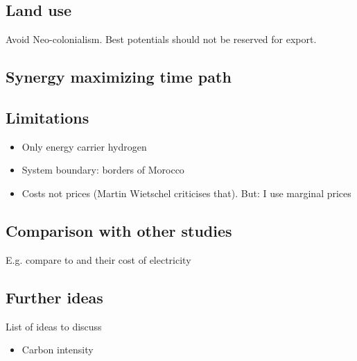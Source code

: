 
\subsection{Land use}
Avoid Neo-colonialism. Best potentials should not be reserved for export.

\subsection{Synergy maximizing time path}

\subsection{Limitations}
\label{subsec:limitations}
\begin{itemize}
    \item Only energy carrier hydrogen
    \item System boundary: borders of Morocco
    \item Costs not prices (Martin Wietschel criticises that). But: I use marginal prices
\end{itemize}

\subsection{Comparison with other studies}
E.g. compare to \cite{Hampp2021} and their cost of electricity

\subsection{Further ideas}
List of ideas to discuss
\begin{itemize}
    \item Carbon intensity
\end{itemize}